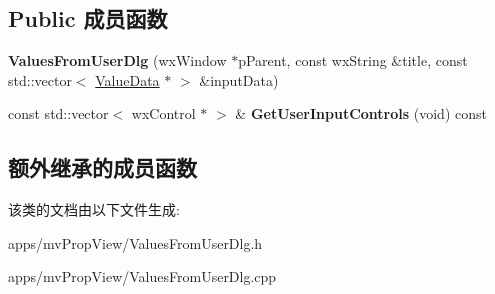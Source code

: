 \subsection*{Public 成员函数}
\begin{DoxyCompactItemize}
\item 
\hypertarget{class_values_from_user_dlg_a683408cc9e0a1477a00bf4e5c2dafaef}{{\bfseries Values\+From\+User\+Dlg} (wx\+Window $\ast$p\+Parent, const wx\+String \&title, const std\+::vector$<$ \hyperlink{struct_value_data}{Value\+Data} $\ast$ $>$ \&input\+Data)}\label{class_values_from_user_dlg_a683408cc9e0a1477a00bf4e5c2dafaef}

\item 
\hypertarget{class_values_from_user_dlg_a90b77bb84e8adefbfe672cc6ae2fe0a1}{const std\+::vector$<$ wx\+Control $\ast$ $>$ \& {\bfseries Get\+User\+Input\+Controls} (void) const }\label{class_values_from_user_dlg_a90b77bb84e8adefbfe672cc6ae2fe0a1}

\end{DoxyCompactItemize}
\subsection*{额外继承的成员函数}


该类的文档由以下文件生成\+:\begin{DoxyCompactItemize}
\item 
apps/mv\+Prop\+View/Values\+From\+User\+Dlg.\+h\item 
apps/mv\+Prop\+View/Values\+From\+User\+Dlg.\+cpp\end{DoxyCompactItemize}
